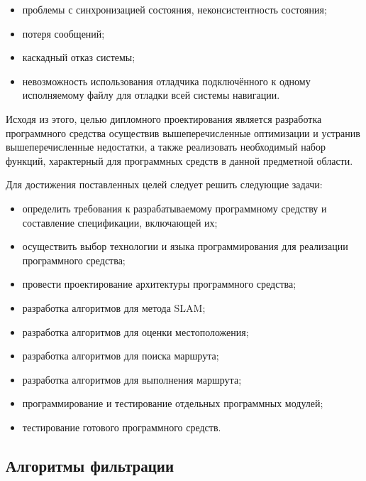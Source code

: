 \begin{itemize}
	\item проблемы с синхронизацией состояния, неконсистентность состояния;
	\item потеря сообщений;
	\item каскадный отказ системы;
	\item невозможность использования отладчика подключённого к одному
		исполняемому файлу для отладки всей системы навигации.
\end{itemize}

Исходя из этого, целью дипломного проектирования является разработка
программного средства осуществив вышеперечисленные оптимизации и устранив
вышеперечисленные недостатки, а также
реализовать необходимый набор функций, характерный для программных средств в
данной предметной области.

Для достижения поставленных целей следует решить следующие задачи: 
\begin{itemize}
	\item определить требования  к  разрабатываемому  программному  средству  и 
	составление спецификации, включающей их; 
	\item осуществить выбор  технологии  и  языка  программирования  для
		реализации программного средства; 
	\item провести проектирование архитектуры программного средства; 
	\item разработка алгоритмов для метода SLAM; 
	\item разработка алгоритмов для оценки местоположения; 
	\item разработка алгоритмов для поиска маршрута; 
	\item разработка алгоритмов для выполнения маршрута; 
	\item программирование и тестирование отдельных программных модулей; 
	\item тестирование готового программного средств.
\end{itemize}


\subsection{Алгоритмы фильтрации}

